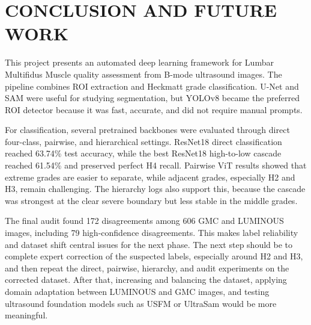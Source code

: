 \chapter{CONCLUSION AND FUTURE WORK}
\label{conclusion}
This project presents an automated deep learning framework for Lumbar Multifidus Muscle quality assessment from B-mode ultrasound images. The pipeline combines ROI extraction and Heckmatt grade classification. U-Net and SAM were useful for studying segmentation, but YOLOv8 became the preferred ROI detector because it was fast, accurate, and did not require manual prompts.

For classification, several pretrained backbones were evaluated through direct four-class, pairwise, and hierarchical settings. ResNet18 direct classification reached 63.74\% test accuracy, while the best ResNet18 high-to-low cascade reached 61.54\% and preserved perfect H4 recall. Pairwise ViT results showed that extreme grades are easier to separate, while adjacent grades, especially H2 and H3, remain challenging. The hierarchy logs also support this, because the cascade was strongest at the clear severe boundary but less stable in the middle grades.

The final audit found 172 disagreements among 606 GMC and LUMINOUS images, including 79 high-confidence disagreements. This makes label reliability and dataset shift central issues for the next phase. The next step should be to complete expert correction of the suspected labels, especially around H2 and H3, and then repeat the direct, pairwise, hierarchy, and audit experiments on the corrected dataset. After that, increasing and balancing the dataset, applying domain adaptation between LUMINOUS and GMC images, and testing ultrasound foundation models such as USFM or UltraSam would be more meaningful.